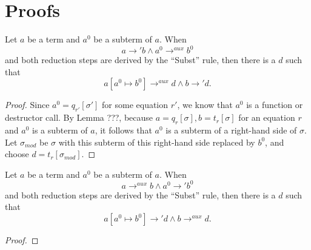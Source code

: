 \chapter{Proofs}

\begin{lemma}
Let $a$ be a term and $a^0$ be a subterm of $a$. When
\[
a \longrightarrow' b \land a^0 \longrightarrow^{aux} b^0
\]
and both reduction steps are derived by the ``Subst'' rule, then there is a $d$ such that
\[
a[a^0 \mapsto b^0] \longrightarrow^{aux} d \land b \longrightarrow' d.
\]

\begin{proof}
Since $a^0 = q_{r'}[\sigma']$ for some equation $r'$, we know that $a^0$ is a function or destructor call. By Lemma ???, because $a = q_r[\sigma], b = t_r[\sigma]$ for an equation $r$ and $a^0$ is a subterm of $a$, it follows that $a^0$ is a subterm of a right-hand side of $\sigma$. Let $\sigma_{mod}$ be $\sigma$ with this subterm of this right-hand side replaced by $b^0$, and choose $d = t_r[\sigma_{mod}]$.
\end{proof}
\end{lemma}

\begin{lemma}
Let $a$ be a term and $a^0$ be a subterm of $a$. When
\[
a \longrightarrow^{aux} b \land a^0 \longrightarrow' b^0
\]
and both reduction steps are derived by the ``Subst'' rule, then there is a $d$ such that
\[
a[a^0 \mapsto b^0] \longrightarrow' d \land b \longrightarrow^{aux} d.
\]

\begin{proof}
\end{proof}
\end{lemma}

